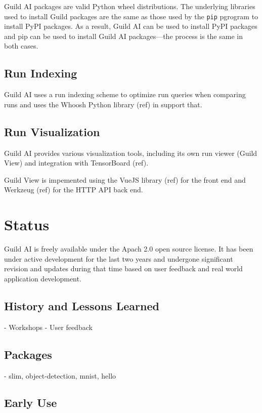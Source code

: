 \documentclass{article}
\begin{document}
Guild AI packages are valid Python wheel distributions. The underlying
libraries used to install Guild packages are the same as those used by
the \verb|pip| pgrogram to install PyPI packages. As a result, Guild
AI can be used to install PyPI packages and pip can be used to install
Guild AI packages---the process is the same in both cases.

\subsection{Run Indexing}

Guild AI uses a run indexing scheme to optimize run queries when
comparing runs and uses the Whoosh Python library (ref) in support
that.

\subsection{Run Visualization}

Guild AI provides various visualization tools, including its own run
viewer (Guild View) and integration with TensorBoard (ref).

Guild View is impemented using the VueJS library (ref) for the front
end and Werkzeug (ref) for the HTTP API back end.

\section{Status}

Guild AI is freely available under the Apach 2.0 open source
license. It has been under active development for the last two years
and undergone significant revision and updates during that time based
on user feedback and real world application development.

\subsection{History and Lessons Learned}

- Workshops
- User feedback

\subsection{Packages}

- slim, object-detection, mnist, hello

\subsection{Early Use}
\end{document}
